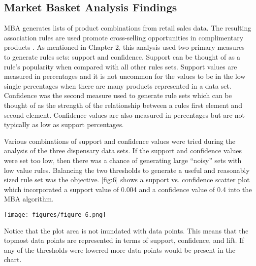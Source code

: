 \documentclass[../article.tex, 12pt]{subfiles}
\begin{document}
\begin{multicols*}{2}
\subsection{Market Basket Analysis Findings}

MBA generates lists of product combinations from retail sales data. The resulting association rules are used promote cross-selling opportunities in complimentary products \citep{malati2017}. As mentioned in Chapter 2, this analysis used two primary measures to generate rules sets: support and confidence. Support can be thought of as a rule's popularity when compared with all other rules sets. Support values are measured in percentages and it is not uncommon for the values to be in the low single percentages when there are many products represented in a data set. Confidence was the second measure used to generate rule sets which can be thought of as the strength of the relationship between a rules first element and second element. Confidence values are also measured in percentages but are not typically as low as support percentages.

\par
Various combinations of support and confidence values were tried during the analysis of the three dispensary data sets. If the support and confidence values were set too low, then there was a chance of generating large ``noisy'' sets with low value rules. Balancing the two thresholds to generate a useful and reasonably sized rule set was the objective. \autoref{fig:6} shows a support vs. confidence scatter plot which incorporated a support value of 0.004 and a confidence value of 0.4 into the MBA algorithm.

\begin{center}
\texttt{[image: figures/figure-6.png]}
\end{center}
\label{fig:6}
\vspace{\baselineskip}

\par
Notice that the plot area is not inundated with data points. This means that the topmost data points are represented in terms of support, confidence, and lift. If any of the thresholds were lowered more data points would be present in the chart.


\end{multicols*}
\end{document}
